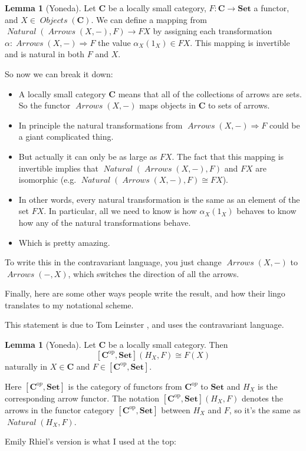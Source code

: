 \documentclass[12pt]{article}
\theoremstyle{definition}
\newtheorem{lemma}[thm]{Lemma}
\theoremstyle{definition}
\theoremstyle{definition}
\numberwithin{equation}{section}
\newcommand{\h}{H}                      %
\newcommand{\op}{\mathrm{op}}           %
\newcommand{\ftrcat}[2]{[#1,#2]}                %
\newcommand{\pshf}[1]{\ftrcat{#1^\op}{\Set}}    %
\newcommand{\cat}[1]{\mathbf{#1}}      %
\newcommand{\fcat}[1]{{\mathbf {#1}}}    %
\newcommand{\CC}{\cat{C}}
\newcommand{\CCop}{\cat{C}^{\mathrm op}}
\DeclareMathOperator{\Arrows}{\mathit{Arrows}}
\DeclareMathOperator{\Objects}{\mathit{Objects}}
\DeclareMathOperator{\Nat}{\mathit{Natural}}
\def\objc{\Objects(\cat{C})}
\newcommand{\Set}{\fcat{Set}}           %
\newcommand{\iso}{\cong}                %
\newcommand{\fto}{\Rightarrow}
\def\pg{\bigskip\goodbreak
\ni}
\def\ni{\goodbreak\noindent}
\begin{document}
\begin{lemma}[Yoneda]\label{yoneda} Let $\CC$ be a locally small category, $F:\CC \to \Set$ a functor,
and $X \in \objc$. We can define a mapping from $\Nat(\Arrows(X, -),F) \to FX$
by assigning each transformation $\alpha: \Arrows(X, -) \fto F$ 
the value $\alpha_X(1_X) \in FX$. 
This mapping is invertible and is natural in both $F$ and $X$.
\end{lemma}
\ni
So now we can break it down:
\begin{itemize}
\item A locally small category $\CC$ means that all of the collections of arrows are sets.
So the functor $\Arrows(X,-)$ maps objects in $\CC$ to sets of arrows.
\item In principle the natural transformations 
from $\Arrows(X, -) \fto F$ could be a giant complicated thing.
\item But actually it can only be as large as $FX$. The fact that this mapping is
invertible implies
that $\Nat(\Arrows(X, -),F)$ and  $FX$ are isomorphic (e.g. $\Nat(\Arrows(X, -),F) \iso FX$).
\item In other words, every natural transformation is the same as
an element of the set $FX$. In particular, all we need to know is how 
$\alpha_X(1_X)$ behaves to know
how any of the natural transformations behave.
\item Which is pretty amazing.
\end{itemize}
To write this in the contravariant language, you just change $\Arrows(X, -)$ to $\Arrows(-, X)$, which
switches the direction of all the arrows.

\pg
Finally, here are some other ways people write the result, and how their lingo translates to 
my notational scheme.

\pg
This statement is due to Tom Leinster \cite{Leinster}, and uses the contravariant language.

\begin{lemma}[Yoneda]   
\label{yoneda-leinster}
Let $\CC$ be a locally small category.  Then
%
$$
\pshf{\CC}(\h_X, F)
\iso
F(X)
$$
%
naturally in $X \in \CC$ and $F \in \pshf{\CC}$.  
\end{lemma}
\ni
Here $[\CCop, \Set]$ is the category of functors from $\CCop$ to $\Set$ and $\h_X$ is the corresponding
arrow functor. The notation $\pshf{\CC}(\h_X, F)$ denotes the arrows in the functor category $\pshf{\CC}$ between 
$\h_X$ and $F$, so it's the same as $\Nat(\h_X, F)$.

\pg
Emily Rhiel's \cite{Rhiel2016} version is what I used at the top:
\end{document}
